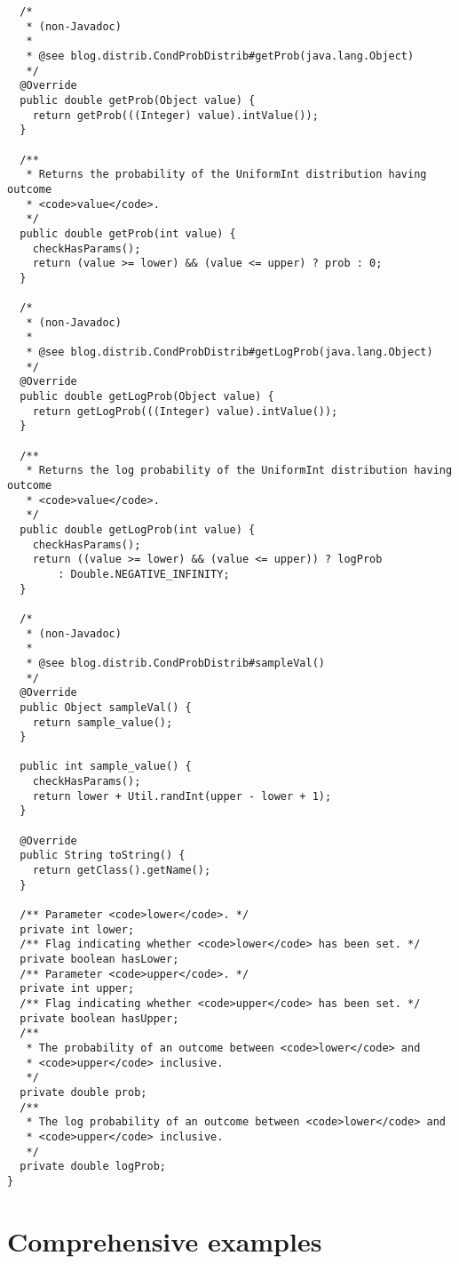 \begin{verbatim}
  /*
   * (non-Javadoc)
   * 
   * @see blog.distrib.CondProbDistrib#getProb(java.lang.Object)
   */
  @Override
  public double getProb(Object value) {
    return getProb(((Integer) value).intValue());
  }

  /**
   * Returns the probability of the UniformInt distribution having outcome
   * <code>value</code>.
   */
  public double getProb(int value) {
    checkHasParams();
    return (value >= lower) && (value <= upper) ? prob : 0;
  }

  /*
   * (non-Javadoc)
   * 
   * @see blog.distrib.CondProbDistrib#getLogProb(java.lang.Object)
   */
  @Override
  public double getLogProb(Object value) {
    return getLogProb(((Integer) value).intValue());
  }

  /**
   * Returns the log probability of the UniformInt distribution having outcome
   * <code>value</code>.
   */
  public double getLogProb(int value) {
    checkHasParams();
    return ((value >= lower) && (value <= upper)) ? logProb
        : Double.NEGATIVE_INFINITY;
  }

  /*
   * (non-Javadoc)
   * 
   * @see blog.distrib.CondProbDistrib#sampleVal()
   */
  @Override
  public Object sampleVal() {
    return sample_value();
  }

  public int sample_value() {
    checkHasParams();
    return lower + Util.randInt(upper - lower + 1);
  }

  @Override
  public String toString() {
    return getClass().getName();
  }

  /** Parameter <code>lower</code>. */
  private int lower;
  /** Flag indicating whether <code>lower</code> has been set. */
  private boolean hasLower;
  /** Parameter <code>upper</code>. */
  private int upper;
  /** Flag indicating whether <code>upper</code> has been set. */
  private boolean hasUpper;
  /**
   * The probability of an outcome between <code>lower</code> and
   * <code>upper</code> inclusive.
   */
  private double prob;
  /**
   * The log probability of an outcome between <code>lower</code> and
   * <code>upper</code> inclusive.
   */
  private double logProb;
}
\end{verbatim}


\section{Comprehensive examples}\label{example-section}

